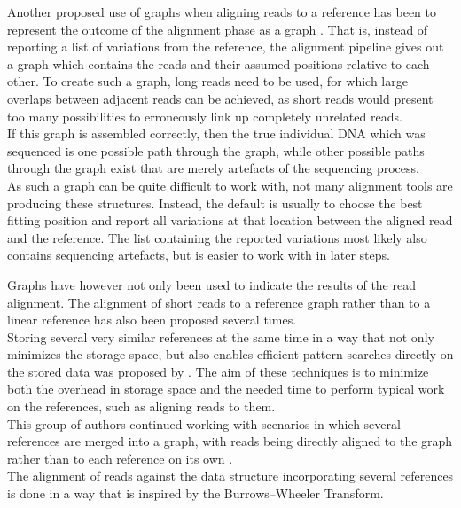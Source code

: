 \documentclass[a4paper,12pt,twoside,BCOR=10mm]{scrbook}
\begin{document}
Another proposed use of graphs when aligning reads to a reference
has been to represent the outcome of the alignment phase as a graph \citet{Myers2005}.
That is, instead of reporting a list of variations from the reference,
the alignment pipeline gives out a graph which contains the reads and their assumed positions
relative to each other.
To create such a graph, long reads need to be used, for which large overlaps
between adjacent reads can be achieved, as short reads would present too many
possibilities to erroneously link up completely unrelated reads. \\
If this graph is assembled correctly, then the true individual DNA which was sequenced
is one possible path through the graph,
while other possible paths through the graph exist that are merely artefacts of the sequencing process. \\
As such a graph can be quite difficult to work with, not many alignment tools are producing these
structures. Instead, the default is usually to choose the best fitting position and
report all variations at that location between the aligned read and the reference.
The list containing the reported variations most likely also contains sequencing artefacts,
but is easier to work with in later steps.

Graphs have however not only been used to indicate the results of the read alignment.
The alignment of short reads to a reference graph rather than to a linear reference has
also been proposed several times. \\
Storing several very similar references at the same time in a way that not only minimizes
the storage space, but also enables efficient pattern searches directly on the
stored data was proposed by \citet{Makinen2010}.
The aim of these techniques is to
minimize both the overhead in storage space and the needed time to perform typical work
on the references, such as aligning reads to them. \\
This group of authors continued working with scenarios in which
several references are merged into a graph, with reads being directly
aligned to the graph rather than to each reference on its own \citep{Siren2014}. \\
The alignment of reads against the data structure incorporating several references
is done in a way that is inspired by the Burrows--Wheeler Transform.
\end{document}
